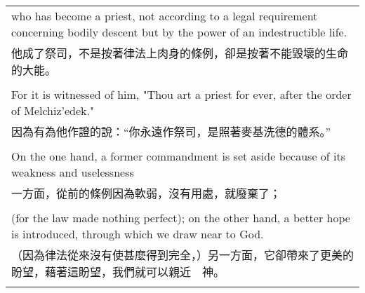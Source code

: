 \documentclass{book}
\begin{document}
\begin{tabularx}{\textwidth}{p{}}
who has become a priest, not according to a legal requirement concerning bodily descent but by the power of an indestructible life. \\
他成了祭司，不是按著律法上肉身的條例，卻是按著不能毀壞的生命的大能。 \\ \\
For it is witnessed of him, "Thou art a priest for ever, after the order of Melchiz'edek." \\
因為有為他作證的說：“你永遠作祭司，是照著麥基洗德的體系。” \\ \\
On the one hand, a former commandment is set aside because of its weakness and uselessness \\
一方面，從前的條例因為軟弱，沒有用處，就廢棄了； \\ \\
(for the law made nothing perfect); on the other hand, a better hope is introduced, through which we draw near to God. \\
（因為律法從來沒有使甚麼得到完全，）另一方面，它卻帶來了更美的盼望，藉著這盼望，我們就可以親近　神。 \\ \\

\hline
\end{tabularx}
\end{document}
